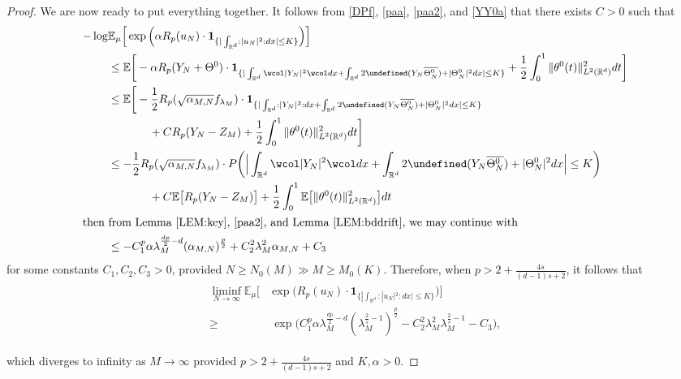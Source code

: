 \documentclass[%
11pt,  reqno]{amsart}
\theoremstyle{remarkstyle}
\newcommand{\1}{\hspace{0.2mm}\text{I}\hspace{0.2mm}}
\newcommand{\noi}{\noindent}
\newcommand{\R}{\mathbb{R}}
\let\Re=\undefined\DeclareMathOperator*{\Re}{Re}
\newcommand{\E}{\mathbb{E}}
\newcommand{\al}{\alpha}
\newcommand{\ld}{\lambda}
\newcommand{\cj}{\overline}
\newcommand{\wick}[1]{\wcol#1\wcol}
\newcommand{\ind}{\mathbf 1}
\newcommand{\PP}{\mathbb{P}}
\numberwithin{equation}{section}
\numberwithin{theorem}{section}
\newcommand{\dr}{\theta}
\newcommand{\Dr}{\Theta}
\begin{document}
\begin{proof}
		We are now ready to put everything together.
		It follows from 
		\eqref{DPf},  \eqref{paa}, \eqref{paa2}, 
		and \eqref{YY0a}
		that there exists $C>0$ such that 
		\begin{align*}
			-\log &  \E_\mu \Big[\exp\Big({  \al R_p (u_N)} \cdot \ind_{\{|\int_{{\R^d}} : |u_N|^2 : dx|  \le K\}}\Big)   \Big]\notag \\
			&\le \E\bigg[ - \al R_p (Y_N + \Dr^0) \cdot 
			\ind_{\{ |  \int_{{\R^d}} \wick{|Y_N|^2} dx + \int_{\R^d} 2 \Re(Y_N \cj{\Dr^0_N}) + |\Dr^0_N|^2  dx  | \le K\}} + \frac 12 \int_0^1 \| \dr^0(t)\|_{L^2(\R^d)} ^2 dt \bigg] \notag \\
			&\le  \E\bigg[ - \frac12 R_p (    \sqrt{\alpha_{M,N}}f_{\ld_M}) \cdot \ind_{\{ |  \int_{{\R^d}} : |Y_N|^2 : dx  + \int_{\R^d} 2 \Re(Y_N \cj{\Dr^0_N}) + |\Dr^0_N|^2  dx | \le K\}} \notag 
			\\
			& \hphantom{XXXX} + C  R_p (Y_N - Z_M)
			+ \frac 12 \int_0^1 \| \dr^0(t)\|_{L^2(\R^d)} ^2 dt \bigg] \notag \\
			&\le    - \frac12 R_p (    \sqrt{\alpha_{M,N}} f_{\ld_M}) \cdot \mathbb \PP\bigg( \Big| \int_{\R^d} \wick{|Y_N|^2} dx + \int_{\R^d} 2 \Re(Y_N \cj{\Dr^0_N}) + |\Dr^0_N|^2  dx \Big| \le K \bigg)  \notag 
			\\
			& \hphantom{XXXX} + C \E \big[ R_p (Y_N - Z_M) \big]
			+ \frac 12 \int_0^1 \E \big[ \| \dr^0(t)\|_{L^2(\R^d)} ^2 \big] dt \notag \\
			\intertext{then from Lemma \ref{LEM:key}, \eqref{paa2}, and Lemma \ref{LEM:bddrift}, we may continue with} 
			& \le -  C_1^p \al \ld_M^{\frac{dp}2-d}  (\al_{M,N})^\frac{p}2+ C_2   ^2 \ld_M^2 \al_{M,N}  + C_3
		\end{align*}
		for some constants $C_1,C_2,C_3>0$, provided  $N \ge N_0(M) \gg M \ge M_0(K)$.
		Therefore, when  $p > 2+ \frac{4s}{(d-1)s+2}$, 
		it follows that
		\begin{align*}
			\begin{split}
				\liminf_{N \to \infty} \E_\mu\Big[& \exp\Big({ R_p (u_N)} \cdot \ind_{\{ | \int_{{\R^d}} : |u_N|^2 : dx | \le K\}}\Big)   \Big]\\
				\ge &~  \exp\Big(  C_1^p \al   \ld_M^{\frac{dp}2-d} (\ld_M^{\frac2s-1})^\frac{p}2 - C_2^2  \ld_M^2 \ld_M^{\frac2s-1}   -C_3 \Big), 
			\end{split}
		\end{align*}
		
		\noi
		which diverges to infinity
		as $M \to \infty$ provided $p > 2+\frac{4s}{(d-1)s+2}$ and $K, \al > 0$.
		

\end{proof}
\end{document}
